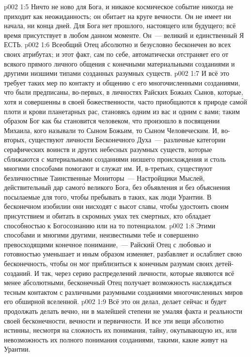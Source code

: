 \vs p002 1:5 Ничто не ново для Бога, и никакое космическое событие никогда не приходит как неожиданность; он обитает на круге вечности. Он не имеет ни начала, ни конца дней. Для Бога нет прошлого, настоящего или будущего; всё время присутствует в любом данном моменте. Он~--- великий и единственный Я ЕСТЬ.
\vs p002 1:6 \pc Всеобщий Отец абсолютно и безусловно бесконечен во всех своих атрибутах; и этот факт, сам по себе, автоматически отстраняет его от всякого прямого личного общения с конечными материальными созданиями и другими низшими типами созданных разумных существ.
\vs p002 1:7 И всё это требует таких мер по контакту и общению с его многочисленными созданиями, что были предписаны, во\hyp{}первых, в личностях Райских Божьих Сынов, которые, хотя и совершенны в своей божественности, часто приобщаются к природе сам\'ой плоти и крови планетарных рас, становясь одним из вас и одним с вами; таким образом Бог как бы становится человеком, что произошло в посвящении Михаила, кого называли то Сыном Божьим, то Сыном Человеческим. И, во\hyp{}вторых, существуют личности Бесконечного Духа~--- различные категории серафических воинств и других небесных разумных существ, которые сближаются с материальными созданиями низшего происхождения и столь многими способами помогают и служат им. И, в\hyp{}третьих, существуют безличностные Таинственные Мониторы~--- Настройщики Мыслей, действительный дар самог\'о великого Бога, без объявления и без объяснения посылаемые для того, чтобы пребывать в таких, как люди Урантии. В бесконечном изобилии они нисходят с высот славы, чтобы удостоить своим присутствием и обитать в скромных умах тех смертных, кто обладает способностью к Богосознанию или на то потенциалом.
\vs p002 1:8 Этими способами и многими другими, неизвестными тебе и совершенно превосходящими конечное понимание,~--- Райский Отец с любовью и готовностью уменьшает и иным образом изменяет, разбавляет и ослабляет свою бесконечность, чтобы он мог приблизиться к конечным разумам своих детей\hyp{}созданий. И так, через серию распределений личности, которые являются всё менее абсолютными, бесконечный Отец получает возможность наслаждаться тесным контактом с различными разумными созданиями многочисленных миров его обширной вселенной.
\vs p002 1:9 Всё это он делал, делает сейчас и будет продолжать делать вечно, ни в малейшей степени не умаляя факта и реальности своей бесконечности, вечности и первичности. И все эти вещи абсолютно истинны, несмотря на сложность их понимания, тайну, окутывающую их, или невозможность их полного понимания созданиями, такими, какие живут на Урантии.
